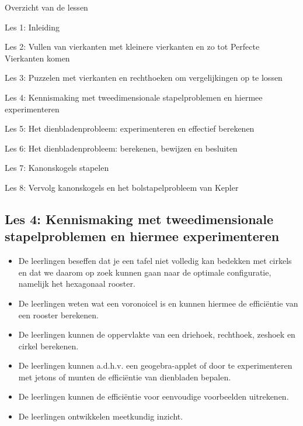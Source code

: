 \documentclass[dutch]{beamer}
\begin{document}
\begin{frame}
{Overzicht van de lessen}
\begin{list}{\quad}{}
\item Les 1: Inleiding
\item Les 2: Vullen van vierkanten met kleinere vierkanten en zo tot Perfecte Vierkanten komen
\item Les 3: Puzzelen met vierkanten en rechthoeken om vergelijkingen op te lossen
\item {\color{blue}Les 4: Kennismaking met tweedimensionale stapelproblemen en hiermee experimenteren}
\item Les 5: Het dienbladenprobleem: experimenteren en effectief berekenen
\item Les 6: Het dienbladenprobleem: berekenen, bewijzen en besluiten
\item Les 7: Kanonskogels stapelen
\item Les 8: Vervolg kanonskogels en het bolstapelprobleem van Kepler
\end{list}
\end{frame}

\subsection{Les 4: Kennismaking met tweedimensionale stapelproblemen en hiermee experimenteren}

\begin{frame}
\begin{itemize}
\item De leerlingen beseffen dat je een tafel niet volledig kan bedekken met cirkels en dat we daarom op zoek kunnen gaan naar de optimale configuratie, namelijk het hexagonaal rooster.
\item De leerlingen weten wat een voronoicel is en kunnen hiermee de effici\"{e}ntie van een rooster berekenen.
\item De leerlingen kunnen de oppervlakte van een driehoek, rechthoek, zeshoek en cirkel berekenen.
\item De leerlingen kunnen a.d.h.v. een geogebra-applet of door te experimenteren met jetons of munten de effici\"{e}ntie van dienbladen bepalen.
\item De leerlingen kunnen de effici\"{e}ntie voor eenvoudige voorbeelden uitrekenen.
\item De leerlingen ontwikkelen meetkundig inzicht.
\end{itemize}
\end{frame}
\end{document}
